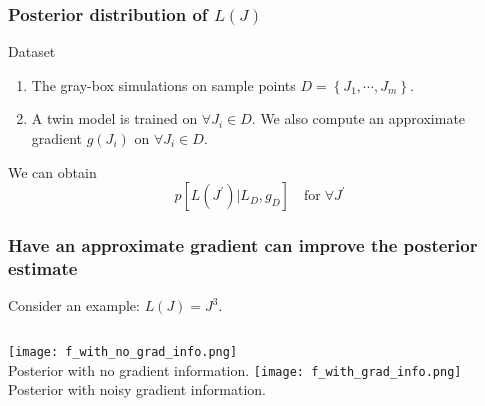 \documentclass{beamer}
\begin{document}
\begin{frame}
    \frametitle{Posterior distribution of $L(J)$}
    \begin{exampleblock}{Dataset}
        \begin{enumerate}
            \item The gray-box simulations on sample points $D=\left\{J_1, \cdots, J_m\right\}$.\\
            \item A twin model is trained on $\forall J_i\in D$. We also compute
                  an approximate gradient $g(J_i)$ on $\forall J_i\in D$. 
        \end{enumerate}
    \end{exampleblock}
    We can obtain
    $$p[L(J^\prime)|L_D, g_D]  \quad \textrm{for}\; \forall J^\prime $$
\end{frame}

\begin{frame}
    \frametitle{Have an approximate gradient can improve the posterior estimate}
    Consider an example: $L(J) = J^3$.
    \scriptsize
    \begin{columns}
        \centering
        \texttt{[image: f\_with\_no\_grad\_info.png]}\\
        Posterior with no gradient information.
        \centering
        \texttt{[image: f\_with\_grad\_info.png]}\\
        Posterior with noisy gradient information.
    \end{columns}
\end{frame}
\end{document}
